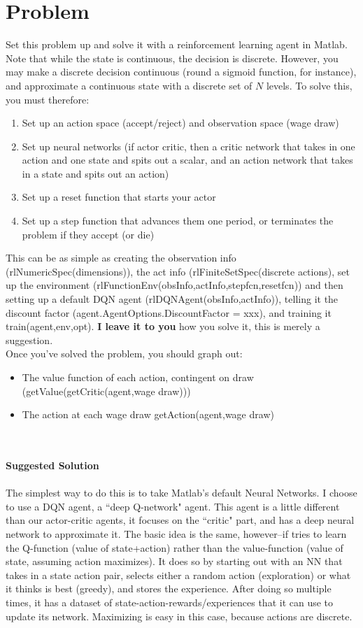 \documentclass[11pt]{article}
\begin{document}
\section{Problem}
Set this problem up and solve it with a reinforcement learning agent in Matlab.  Note that while the state is continuous, the decision is discrete.  However, you may make a discrete decision continuous (round a sigmoid function, for instance), and approximate a continuous state with a discrete set of $N$ levels.  To solve this, you must therefore:
\begin{enumerate}
\item Set up an action space (accept/reject) and observation space (wage draw)
\item Set up neural networks (if actor critic, then a critic network that takes in one action and one state and spits out a scalar, and an action network that takes in a state and spits out an action)
\item Set up a reset function that starts your actor
\item Set up a step function that advances them one period, or terminates the problem if they accept (or die)
\end{enumerate}
This can be as simple as creating the observation info (rlNumericSpec(dimensions)), the act info (rlFiniteSetSpec(discrete actions), set up the environment (rlFunctionEnv(obsInfo,actInfo,stepfcn,resetfcn)) and then setting up a default DQN agent (rlDQNAgent(obsInfo,actInfo)), telling it the discount factor (agent.AgentOptions.DiscountFactor = xxx), and training it train(agent,env,opt).  \textbf{I leave it to you} how you solve it, this is merely a suggestion.\\
 Once you've solved the problem, you should graph out:
 \begin{itemize}
 \item The value function of each action, contingent on draw (getValue(getCritic(agent,wage draw)))
 \item The action at each wage draw getAction(agent,wage draw)
 \end{itemize}
 \ \\
 \ \\
 \textbf{Suggested Solution}\ \\
 \ \\
 The simplest way to do this is to take Matlab's default Neural Networks.  I choose to use a DQN agent, a ``deep Q-network"  agent.  This agent is a little different than our actor-critic agents, it focuses on the ``critic" part, and has a deep neural network to approximate it.  The basic idea is the same, however--if tries to learn the Q-function (value of state+action) rather than the value-function (value of state, assuming action maximizes).  It does so by starting out with an NN that takes in a state action pair, selects either a random action (exploration) or what it thinks is best (greedy), and stores the experience.  After doing so multiple times, it has a dataset of state-action-rewards/experiences that it can use to update its network.  Maximizing is easy in this case, because actions are discrete.\\
\end{document}
